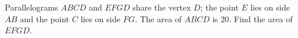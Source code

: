 Parallelograms $ABCD$ and $EFGD$ share the vertex $D$; the point $E$ lies on side $AB$ and the point $C$ lies on side $FG$. The area of $ABCD$ is $20$. Find the area of $EFGD$.
